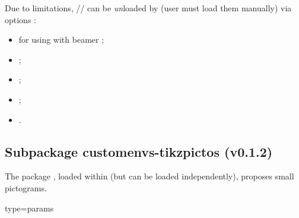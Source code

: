 \documentclass[english,11pt,a4paper]{article}
\begin{document}
Due to limitations, // can be \textit{un}loaded by  (user must load them manually) via options :

\begin{itemize}
	\item {} for using with \textsf{beamer} ;
	\item {} ;
	\item {} ;
	\item {} ;
	\item {}.
\end{itemize}

\begin{codehigh}[language=latex/latex3,style/main=teal!25,style/code=teal!25]
\usepackage{customenvs}

\usepackage[option(s)]{customenvs}
\end{codehigh}

\pagebreak

\subsection{Subpackage customenvs-tikzpictos (v0.1.2)}

The package , loaded within  (but can be loaded independently), proposes small pictograms.

\begin{codehigh}[language=latex/latex3,style/main=teal!25,style/code=teal!25]

    {type=params}

\end{codehigh}
\end{document}
